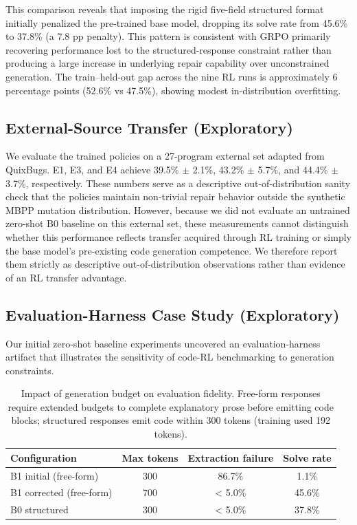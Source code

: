 \documentclass{article}
\begin{document}
This comparison reveals that imposing the rigid five-field structured format initially penalized the pre-trained base model, dropping its solve rate from 45.6\% to 37.8\% (a 7.8 pp penalty). This pattern is consistent with GRPO primarily recovering performance lost to the structured-response constraint rather than producing a large increase in underlying repair capability over unconstrained generation. The train--held-out gap across the nine RL runs is approximately 6 percentage points (52.6\% vs 47.5\%), showing modest in-distribution overfitting.

\subsection{External-Source Transfer (Exploratory)}
We evaluate the trained policies on a 27-program external set adapted from QuixBugs. E1, E3, and E4 achieve 39.5\% $\pm$ 2.1\%, 43.2\% $\pm$ 5.7\%, and 44.4\% $\pm$ 3.7\%, respectively. These numbers serve as a descriptive out-of-distribution sanity check that the policies maintain non-trivial repair behavior outside the synthetic MBPP mutation distribution. However, because we did not evaluate an untrained zero-shot B0 baseline on this external set, these measurements cannot distinguish whether this performance reflects transfer acquired through RL training or simply the base model's pre-existing code generation competence. We therefore report them strictly as descriptive out-of-distribution observations rather than evidence of an RL transfer advantage.

\subsection{Evaluation-Harness Case Study (Exploratory)}
\label{sec:harness}
Our initial zero-shot baseline experiments uncovered an evaluation-harness artifact that illustrates the sensitivity of code-RL benchmarking to generation constraints.

\begin{table}[h]
\centering
\small
\begin{tabular}{l c c c}
\toprule
\textbf{Configuration} & \textbf{Max tokens} & \textbf{Extraction failure} & \textbf{Solve rate} \\
\midrule
B1 initial (free-form) & 300 & 86.7\% & 1.1\% \\
B1 corrected (free-form) & 700 & < 5.0\% & 45.6\% \\
B0 structured & 300 & < 5.0\% & 37.8\% \\
\bottomrule
\end{tabular}
\caption{Impact of generation budget on evaluation fidelity. Free-form responses require extended budgets to complete explanatory prose before emitting code blocks; structured responses emit code within 300 tokens (training used 192 tokens).}
\label{tab:truncation}
\end{table}
\end{document}
